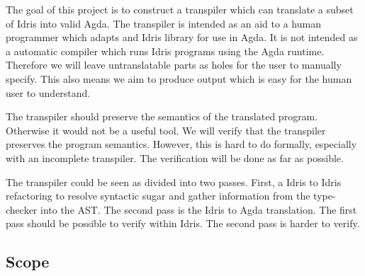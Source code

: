 \documentclass[parskip=half]{scrartcl}
\begin{document}
The goal of this project is to construct a transpiler which can translate
a subset of Idris into valid Agda. The transpiler is intended as an aid to
a human programmer which adapts and Idris library for use in Agda.  It is not
intended as a automatic compiler which runs Idris programs using the Agda
runtime. Therefore we will leave untranslatable parts as holes for the user to
manually specify. This also means we aim to produce output which is easy for
the human user to understand.



The transpiler should preserve the semantics of the translated program.
Otherwise it would not be a useful tool.  We will verify that the transpiler
preserves the program semantics.  However, this is hard to do formally,
especially with an incomplete transpiler.  The verification will be done as far
as possible.


The transpiler could be seen as divided into two passes. First, a Idris to
Idris refactoring to resolve syntactic sugar and gather information from the
type-checker into the AST. The second pass is the Idris to Agda translation.
The first pass should be possible to verify within Idris. The second pass is
harder to verify.


\subsection{Scope}
\end{document}
